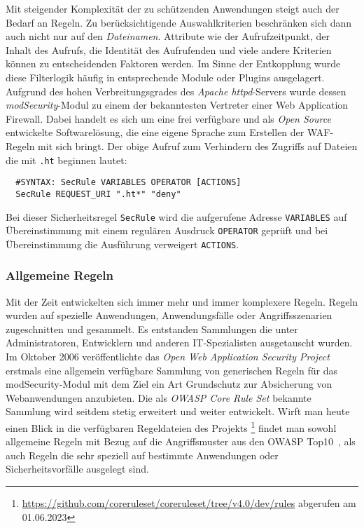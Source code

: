 Mit steigender Komplexität der zu schützenden Anwendungen steigt auch der Bedarf an Regeln. Zu berücksichtigende Auswahlkriterien beschränken sich dann auch nicht nur auf den \glqq\emph{Dateinamen}\grqq. Attribute wie der Aufrufzeitpunkt, der Inhalt des Aufrufs, die Identität des Aufrufenden und viele andere Kriterien können zu entscheidenden Faktoren werden. Im Sinne der Entkopplung wurde diese Filterlogik häufig in entsprechende Module oder Plugins ausgelagert. Aufgrund des hohen Verbreitungsgrades des \emph{Apache httpd}-Servers wurde dessen \emph{modSecurity}-Modul zu einem der bekanntesten Vertreter einer Web Application Firewall. Dabei handelt es sich um eine frei verfügbare und als \emph{Open Source} entwickelte Softwarelösung, die eine eigene Sprache zum Erstellen der WAF-Regeln mit sich bringt. Der obige Aufruf zum Verhindern des Zugriffs auf Dateien die mit \texttt{.ht} beginnen lautet:

\begin{lstlisting}
  #SYNTAX: SecRule VARIABLES OPERATOR [ACTIONS]        
  SecRule REQUEST_URI ".ht*" "deny"
\end{lstlisting}

Bei dieser Sicherheitsregel \verb=SecRule= wird die aufgerufene Adresse \verb=VARIABLES= auf Übereinstimmung mit einem regulären Ausdruck \verb=OPERATOR= geprüft und bei Übereinstimmung die Ausführung verweigert \verb=ACTIONS=.

\subsubsection{Allgemeine Regeln}
Mit der Zeit entwickelten sich immer mehr und immer komplexere Regeln. Regeln wurden auf spezielle Anwendungen, Anwendungsfälle oder Angriffsszenarien zugeschnitten und gesammelt. Es entstanden Sammlungen die unter Administratoren, Entwicklern und anderen IT-Spezialisten ausgetauscht wurden.
Im Oktober 2006 veröffentlichte das \emph{Open Web Application Security Project} erstmals eine allgemein verfügbare Sammlung von generischen Regeln für das modSecurity-Modul mit dem Ziel ein Art Grundschutz zur Absicherung von Webanwendungen anzubieten. Die als \emph{OWASP Core Rule Set} bekannte Sammlung wird seitdem stetig erweitert und weiter entwickelt. Wirft man heute einen Blick in die verfügbaren Regeldateien des Projekts \footnote{\url{https://github.com/coreruleset/coreruleset/tree/v4.0/dev/rules} abgerufen am 01.06.2023} findet man sowohl allgemeine Regeln mit Bezug auf die Angriffsmuster aus den OWASP Top10~\cite{owasp10}, als auch Regeln die sehr speziell auf bestimmte Anwendungen oder Sicherheitsvorfälle ausgelegt sind.

